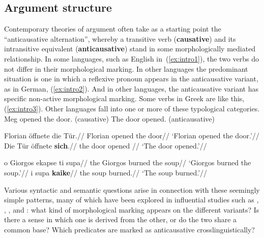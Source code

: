 	\subsection{Argument structure}
Contemporary theories of argument often take as a starting point the ``anticausative alternation'', whereby a transitive verb (\textbf{causative}) and its intransitive equivalent (\textbf{anticausative}) stand in some morphologically mediated relationship. In some languages, such as English in~(\ref{ex:intro1}), the two verbs do not differ in their morphological marking. In other languages the predominant situation is one in which a reflexive pronoun appears in the anticausative variant, as in German, (\ref{ex:intro2}). And in other languages, the anticausative variant has specific non-active morphological marking. Some verbs in Greek are like this, (\ref{ex:intro3}). Other languages fall into one or more of these typological categories.
\pex\label{ex:intro1}
	\a Meg opened the door. \hfill (causative)
 	\a The door opened.			\hfill (anticausative)
\xe

\pex\label{ex:intro2}
	\a \begingl
		\gla{}Florian \"offnete die T\"ur.//
		\glb Florian opened the door//
		\glft `Florian opened the door.'//
	\endgl
	\a \begingl
		\gla{}Die T\"ur \"offnete \textbf{sich}.//
		\glb the door opened //
		\glft `The door opened.'//
	\endgl
\xe	

\pex\label{ex:intro3}
	\a \begingl
		\gla{}o Giorgos ekapse ti supa//
		\glb the Giorgos burned the soup//
		\glft `Giorgos burned the soup.'//
	\endgl
	\a \begingl
		\gla{}i supa \textbf{kaike}//
		\glb the soup burned.//
		\glft `The soup burned.'//
	\endgl
\xe

Various syntactic and semantic questions arise in connection with these seemingly simple patterns, many of which have been explored in influential studies such as \cite{haspelmath93}, \cite{unaccusativity95}, \cite{schaefer08}, \cite{koontzgarboden09} and \cite{layering15}: what kind of morphological marking appears on the different variants? Is there a sense in which one is derived from the other, or do the two share a common base? Which predicates are marked as anticausative crosslinguistically? 

